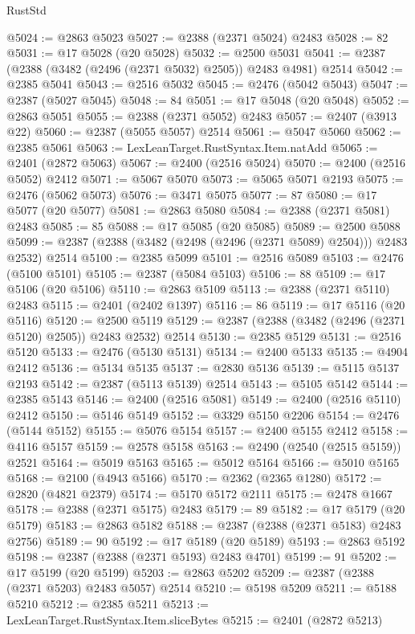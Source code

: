\begin{lexlean}{RustStd}
\begin{coremodule}
@5024 := @2863 @5023
@5027 := @2388 (@2371 @5024) @2483
@5028 := 82
@5031 := @17 @5028 (@20 @5028)
@5032 := @2500 @5031
@5041 := @2387 (@2388 (@3482 (@2496 (@2371 @5032) @2505)) @2483 @4981) @2514
@5042 := @2385 @5041
@5043 := @2516 @5032
@5045 := @2476 (@5042 @5043)
@5047 := @2387 (@5027 @5045)
@5048 := 84
@5051 := @17 @5048 (@20 @5048)
@5052 := @2863 @5051
@5055 := @2388 (@2371 @5052) @2483
@5057 := @2407 (@3913 @22)
@5060 := @2387 (@5055 @5057) @2514
@5061 := @5047 @5060
@5062 := @2385 @5061
@5063 := LexLeanTarget.RustSyntax.Item.natAdd
@5065 := @2401 (@2872 @5063)
@5067 := @2400 (@2516 @5024)
@5070 := @2400 (@2516 @5052) @2412
@5071 := @5067 @5070
@5073 := @5065 @5071 @2193
@5075 := @2476 (@5062 @5073)
@5076 := @3471 @5075
@5077 := 87
@5080 := @17 @5077 (@20 @5077)
@5081 := @2863 @5080
@5084 := @2388 (@2371 @5081) @2483
@5085 := 85
@5088 := @17 @5085 (@20 @5085)
@5089 := @2500 @5088
@5099 := @2387 (@2388 (@3482 (@2498 (@2496 (@2371 @5089) @2504))) @2483 @2532) @2514
@5100 := @2385 @5099
@5101 := @2516 @5089
@5103 := @2476 (@5100 @5101)
@5105 := @2387 (@5084 @5103)
@5106 := 88
@5109 := @17 @5106 (@20 @5106)
@5110 := @2863 @5109
@5113 := @2388 (@2371 @5110) @2483
@5115 := @2401 (@2402 @1397)
@5116 := 86
@5119 := @17 @5116 (@20 @5116)
@5120 := @2500 @5119
@5129 := @2387 (@2388 (@3482 (@2496 (@2371 @5120) @2505)) @2483 @2532) @2514
@5130 := @2385 @5129
@5131 := @2516 @5120
@5133 := @2476 (@5130 @5131)
@5134 := @2400 @5133
@5135 := @4904 @2412
@5136 := @5134 @5135
@5137 := @2830 @5136
@5139 := @5115 @5137 @2193
@5142 := @2387 (@5113 @5139) @2514
@5143 := @5105 @5142
@5144 := @2385 @5143
@5146 := @2400 (@2516 @5081)
@5149 := @2400 (@2516 @5110) @2412
@5150 := @5146 @5149
@5152 := @3329 @5150 @2206
@5154 := @2476 (@5144 @5152)
@5155 := @5076 @5154
@5157 := @2400 @5155 @2412
@5158 := @4116 @5157
@5159 := @2578 @5158
@5163 := @2490 (@2540 (@2515 @5159)) @2521
@5164 := @5019 @5163
@5165 := @5012 @5164
@5166 := @5010 @5165
@5168 := @2100 (@4943 @5166)
@5170 := @2362 (@2365 @1280)
@5172 := @2820 (@4821 @2379)
@5174 := @5170 @5172 @2111
@5175 := @2478 @1667
@5178 := @2388 (@2371 @5175) @2483
@5179 := 89
@5182 := @17 @5179 (@20 @5179)
@5183 := @2863 @5182
@5188 := @2387 (@2388 (@2371 @5183) @2483 @2756)
@5189 := 90
@5192 := @17 @5189 (@20 @5189)
@5193 := @2863 @5192
@5198 := @2387 (@2388 (@2371 @5193) @2483 @4701)
@5199 := 91
@5202 := @17 @5199 (@20 @5199)
@5203 := @2863 @5202
@5209 := @2387 (@2388 (@2371 @5203) @2483 @5057) @2514
@5210 := @5198 @5209
@5211 := @5188 @5210
@5212 := @2385 @5211
@5213 := LexLeanTarget.RustSyntax.Item.sliceBytes
@5215 := @2401 (@2872 @5213)

\end{coremodule}
\end{lexlean}
